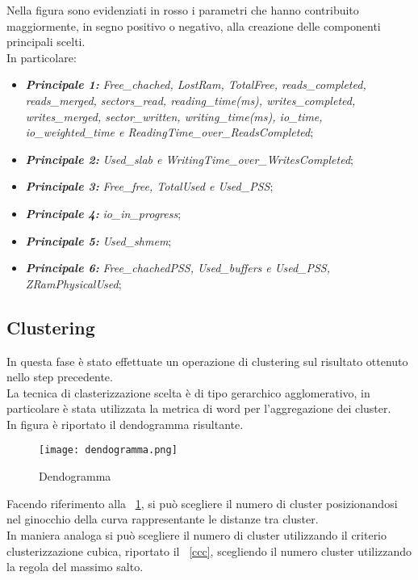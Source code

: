 Nella figura sono evidenziati in rosso i parametri che hanno contribuito maggiormente,
in segno positivo o negativo, alla creazione delle componenti principali scelti.\\
In particolare:
\begin{itemize}
  \item \textbf{\textit{Principale 1:}} \textit{Free\_chached, LostRam, TotalFree,
  reads\_completed, reads\_merged, sectors\_read, reading\_time(ms),
  writes\_completed, writes\_merged, sector\_written, writing\_time(ms),
  io\_time, io\_weighted\_time e ReadingTime\_over\_ReadsCompleted};
  \item \textbf{\textit{Principale 2:}} \textit{Used\_slab e WritingTime\_over\_WritesCompleted};
  \item \textbf{\textit{Principale 3:}} \textit{Free\_free, TotalUsed e Used\_PSS};
  \item \textbf{\textit{Principale 4:}} \textit{io\_in\_progress};
  \item \textbf{\textit{Principale 5:}} \textit{Used\_shmem};
  \item \textbf{\textit{Principale 6:}} \textit{Free\_chachedPSS, Used\_buffers e Used\_PSS, ZRamPhysicalUsed};
\end{itemize}

\subsection{Clustering}
In questa fase è stato effettuate un operazione di clustering sul risultato
ottenuto nello step precedente.\\
La tecnica di clasterizzazione scelta è di tipo gerarchico agglomerativo,
in particolare è stata utilizzata la metrica di word
per l'aggregazione dei cluster.\\
In figura è riportato il dendogramma risultante.\\


\begin{figure}[!htbp]
	\texttt{[image: dendogramma.png]}
  \caption{Dendogramma}
  \label{dendogramma}
\end{figure}

Facendo riferimento alla \figurename~\ref{dendogramma}, si può scegliere il numero
di cluster posizionandosi nel ginocchio della curva rappresentante le distanze tra cluster.\\
\clearpage
In maniera analoga si può scegliere il numero di cluster utilizzando il criterio
clusterizzazione cubica, riportato il \figurename~\ref{ccc}, scegliendo il numero
cluster utilizzando la regola del massimo salto.\\

